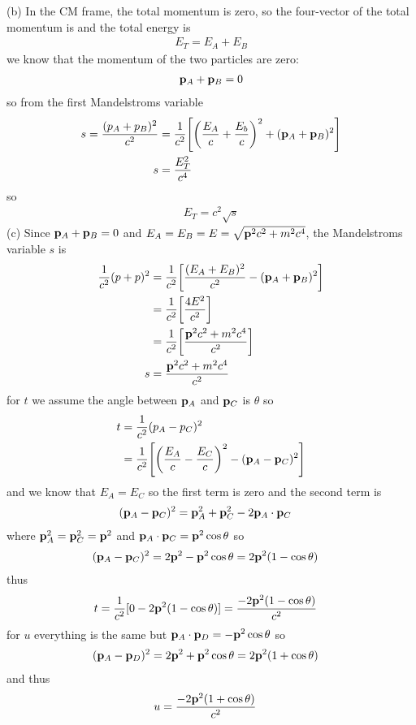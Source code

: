 \documentclass[../main.tex]{subfiles}
\begin{document}
(b) In the CM frame, the total momentum is zero, so the four-vector of the total momentum is
and the total energy is
\begin{align*}
    E_T = E_A + E_B
\end{align*}
we know that the momentum of the two particles are zero:
\begin{align*}
    \vb p_A + \vb p_B = 0
\end{align*}
so from the first Mandelstroms variable
\begin{align*}
    s = \frac{(p_A + p_B)^2}{c^2} &= \frac{1}{c^2} \qt[\qt(\frac{E_A}{c} + \frac{E_b}{c})^2 
        + (\vb p_A + \vb p_B)^2] \\
    s &= \frac{E_T^2}{c^4} 
\end{align*}
so
\begin{align*}
    E_T = c^2 \sqrt{s}
\end{align*}
(c) Since $\vb p_A + \vb p_B = 0$ and $E_A = E_B = E = \sqrt{\vb p^2 c^2 + m^2 c^4}$, the
Mandelstroms variable $s$ is
\begin{align*}
    \frac{1}{c^2} (p + p)^2 &= \frac{1}{c^2} \qt[\frac{(E_A + E_B)^2}{c^2} - (\vb p_A + \vb p_B)^2] \\
    &= \frac{1}{c^2} \qt[\frac{4E^2}{c^2}] \\
    &= \frac{1}{c^2} \qt[\frac{\vb p^2 c^2 + m^2 c^4}{c^2}] \\
    s &= \frac{\vb p^2 c^2 + m^2 c^4}{c^2}
\end{align*}
for $t$ we assume the angle between $\vb p_A$ and $\vb p_C$ is $\theta$ so
\begin{align*}
    t &= \frac{1}{c^2} (p_A - p_C)^2 \\
    &= \frac{1}{c^2} \qt[\qt(\frac{E_A}{c} - \frac{E_C}{c})^2 - (\vb p_A - \vb p_C)^2]
\end{align*}
and we know that $E_A = E_C$ so the first term is zero and the second term is
\begin{align*}
    (\vb p_A - \vb p_C)^2 &= \vb p_A^2 + \vb p_C^2 - 2 \vb p_A \cdot \vb p_C 
\end{align*}
where $\vb p_A^2 = \vb p_C^2 = \vb p^2$ and $\vb p_A \cdot \vb p_C = \vb p^2 \cos \theta$ so
\begin{align*}
    (\vb p_A - \vb p_C)^2 &= 2 \vb p^2 - \vb p ^2 \cos \theta = 2 \vb p^2 (1 - \cos \theta)
\end{align*}
thus
\begin{align*}
    t &= \frac{1}{c^2} [0 - 2 \vb p^2 (1 - \cos \theta)] = \frac{-2 \vb p^2(1 - \cos \theta)}{c^2} 
\end{align*}
for $u$ everything is the same but $\vb p_A \cdot \vb p_D = - \vb p^2 \cos \theta$ so
\begin{align*}
    (\vb p_A - \vb p_D)^2 &= 2 \vb p^2 + \vb p^2 \cos \theta = 2 \vb p^2 (1 + \cos \theta)
\end{align*}
and thus
\begin{align*}
    u &= \frac{-2 \vb p^2 (1 + \cos \theta)}{c^2}
\end{align*}
\end{document}
